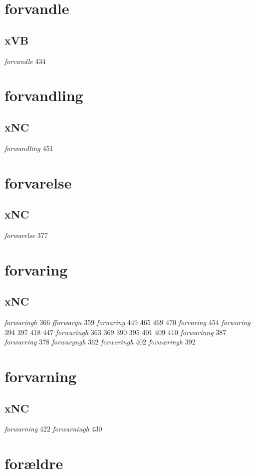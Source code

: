 \documentclass[a4paper,twocolumn]{article}
\begin{document}
\section{forvandle}
\label{sec:org25669dd}
\subsection{xVB}
\label{sec:org9932670}
\emph{forvandle} 434 
\section{forvandling}
\label{sec:org51373bf}
\subsection{xNC}
\label{sec:org250bcba}
\emph{forwandling} 451 
\section{forvarelse}
\label{sec:orge3dc272}
\subsection{xNC}
\label{sec:org7ebb9b9}
\emph{forwarelse} 377 
\section{forvaring}
\label{sec:orgbebae9f}
\subsection{xNC}
\label{sec:orgf2e1ff0}
\emph{farwaringh} 366 \emph{fforwaryn} 359 \emph{foruaring} 449 465 469 470 \emph{forvoring} 454 \emph{forwaring} 394 397 418 447 \emph{forwaringh} 363 369 390 395 401 409 410 \emph{forwarinng} 387 \emph{forwarring} 378 \emph{forwaryngh} 362 \emph{forworingh} 402 \emph{forwæringh} 392 
\section{forvarning}
\label{sec:org525ebd1}
\subsection{xNC}
\label{sec:org44cfb4b}
\emph{forwarning} 422 \emph{forwarningh} 430 
\section{forældre}
\label{sec:org3a746b2}
\end{document}
